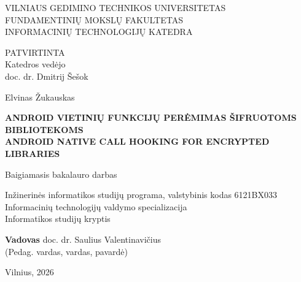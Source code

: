 \documentclass[11pt,a4paper]{report}
\renewcommand\_{{\textunderscore\allowbreak}}
\begin{document}
\begin{titlepage}
    \centering

    {\large\MakeUppercase{VILNIAUS GEDIMINO TECHNIKOS UNIVERSITETAS}\\}
    {\normalsize\MakeUppercase{Fundamentinių mokslų fakultetas}\\}
    {\normalsize\MakeUppercase{Informacinių technologijų katedra}\\}

    \vspace{1cm}

    \begin{flushright}
        \small
        PATVIRTINTA \\
        Katedros vedėjo \\
        doc. dr. Dmitrij Šešok
    \end{flushright}

    \vspace{2cm}

    \normalsize
    Elvinas Žukauskas

    \vspace{1cm}

    \large
    \textbf{\MakeUppercase{Android vietinių funkcijų perėmimas šifruotoms bibliotekoms}}\\[0.5cm]
    \textbf{\MakeUppercase{Android native call hooking for encrypted libraries}}

    \vspace{2cm}

    \large
    Baigiamasis bakalauro darbas

    \vspace{2cm}

    \normalsize
    Inžinerinės informatikos studijų programa, valstybinis kodas 6121BX033 \\
    Informacinių technologijų valdymo specializacija \\
    Informatikos studijų kryptis

    \vspace{2.5cm}

    \begin{flushright}
        \normalsize
        \textbf{Vadovas} doc. dr. Saulius Valentinavičius\\
        {\tiny (Pedag. vardas, vardas, pavardė)}\\[0.8cm]
    \end{flushright}

    \vfill

    \normalsize
    Vilnius, 2026

\end{titlepage}
\newpage
\end{document}
